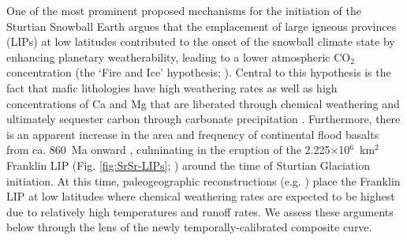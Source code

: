 One of the most prominent proposed mechanisms for the initiation of the Sturtian Snowball Earth argues that the emplacement of large igneous provinces (LIPs) at low latitudes contributed to the onset of the snowball climate state by enhancing planetary weatherability, leading to a lower atmospheric CO$_{2}$ concentration (the `Fire and Ice' hypothesis; \citealp{Godderis2003a, Cox2016a}). Central to this hypothesis is the fact that mafic lithologies have high weathering rates as well as high concentrations of Ca and Mg that are liberated through chemical weathering and ultimately sequester carbon through carbonate precipitation \citep{Dessert2001a}. Furthermore, there is an apparent increase in the area and frequency of continental flood basalts from ca. 860~Ma onward \citep{Cox2016a}, culminating in the eruption of the 2.225$\times$10$^{6}$~km$^{2}$ Franklin LIP (Fig. \ref{fig:SrSr-LIPs}; \citealp{Ernst2008a}) around the time of Sturtian Glaciation initiation. At this time, paleogeographic reconstructions (e.g. \citealp{Li2008a}) place the Franklin LIP at low latitudes where chemical weathering rates are expected to be highest due to relatively high temperatures and runoff rates. We assess these arguments below through the lens of the newly temporally-calibrated composite \SrSr curve.

